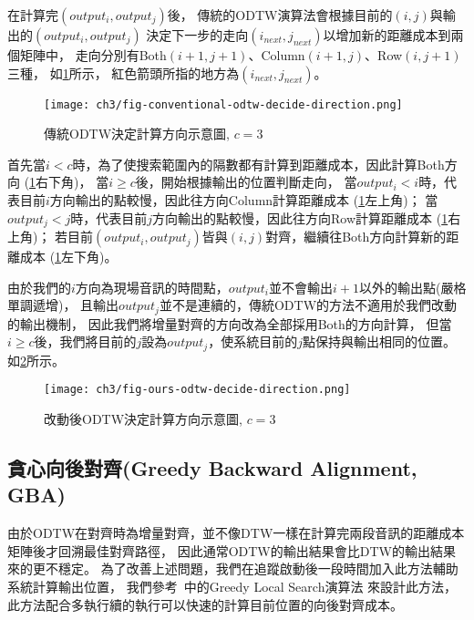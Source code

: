 \documentclass[class=NCU_thesis, crop=false]{standalone}
\begin{document}
在計算完$(output_i, output_j)$後，
傳統的ODTW演算法會根據目前的$(i, j)$與輸出的$(output_i, output_j)$
決定下一步的走向$(i_{next}, j_{next})$以增加新的距離成本到兩個矩陣中，
走向分別有Both$(i+1, j+1)$、Column$(i+1, j)$、Row$(i, j+1)$三種，
如\cref{fig:fig-ch3-conventional-odtw-decide-direction}所示，
紅色箭頭所指的地方為$(i_{next}, j_{next})$。
\begin{figure}[H]
    \centering
    \texttt{[image: ch3/fig-conventional-odtw-decide-direction.png]}
    \caption{傳統ODTW決定計算方向示意圖, $c=3$}
    \label{fig:fig-ch3-conventional-odtw-decide-direction}
\end{figure}
首先當$i < c$時，為了使搜索範圍內的隔數都有計算到距離成本，因此計算Both方向
(\cref{fig:fig-ch3-conventional-odtw-decide-direction}右下角)，
當$i \geq  c$後，開始根據輸出的位置判斷走向，
當$output_i < i$時，代表目前$i$方向輸出的點較慢，因此往方向Column計算距離成本
(\cref{fig:fig-ch3-conventional-odtw-decide-direction}左上角)；
當$output_j < j$時，代表目前$j$方向輸出的點較慢，因此往方向Row計算距離成本
(\cref{fig:fig-ch3-conventional-odtw-decide-direction}右上角)；
若目前$(output_i, output_j)$皆與$(i, j)$對齊，繼續往Both方向計算新的距離成本
(\cref{fig:fig-ch3-conventional-odtw-decide-direction}左下角)。

由於我們的$i$方向為現場音訊的時間點，$output_i$並不會輸出$i+1$以外的輸出點(嚴格單調遞增)，
且輸出$output_j$並不是連續的，傳統ODTW的方法不適用於我們改動的輸出機制，
因此我們將增量對齊的方向改為全部採用Both的方向計算，
但當$i \geq  c$後，我們將目前的$j$設為$output_j$，使系統目前的$j$點保持與輸出相同的位置。
如\cref{fig:fig-ch3-ours-odtw-decide-direction}所示。
\begin{figure}[H]
    \centering
    \texttt{[image: ch3/fig-ours-odtw-decide-direction.png]}
    \caption{改動後ODTW決定計算方向示意圖, $c=3$}
    \label{fig:fig-ch3-ours-odtw-decide-direction}
\end{figure}

\subsection{貪心向後對齊(Greedy Backward Alignment, GBA)} \label{ch3-subst-GBA}
由於ODTW在對齊時為增量對齊，並不像DTW一樣在計算完兩段音訊的距離成本矩陣後才回溯最佳對齊路徑，
因此通常ODTW的輸出結果會比DTW的輸出結果來的更不穩定。
為了改善上述問題，我們在追蹤啟動後一段時間加入此方法輔助系統計算輸出位置，
我們參考~\cite{Arzt2010Towards}中的Greedy Local Search演算法
來設計此方法，此方法配合多執行續的執行可以快速的計算目前位置的向後對齊成本。
\end{document}
